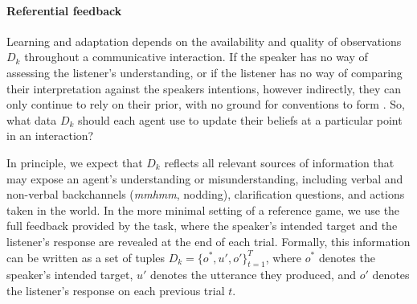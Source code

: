 \paragraph{Referential feedback}

Learning and adaptation depends on the availability and quality of observations $D_k$ throughout a communicative interaction.
If the speaker has no way of assessing the listener's understanding, or if the listener has no way of comparing their interpretation against the speakers intentions, however indirectly, they can only continue to rely on their prior, with no ground for conventions to form  \cite{KraussWeinheimer66_Tangrams,HupetChantraine92_CollaborationOrRepitition,GarrodFayLeeOberlanderMacLeod07_GraphicalSymbolSystems}.
So, what data $D_k$ should each agent use to update their beliefs at a particular point in an interaction?

In principle, we expect that $D_k$ reflects all relevant sources of information that may expose an agent's understanding or misunderstanding, including verbal and non-verbal backchannels (\emph{mmhmm}, nodding), clarification questions, and actions taken in the world.
In the more minimal setting of a reference game, we use the full feedback provided by the task, where the speaker's intended target and the listener's response are revealed at the end of each trial. 
Formally, this information can be written as a set of tuples $D_k = \{o^*, u', o'\}_{t=1}^T$, where $o^*$ denotes the speaker's intended target, $u'$ denotes the utterance they produced, and $o'$ denotes the listener's response on each previous trial $t$.

